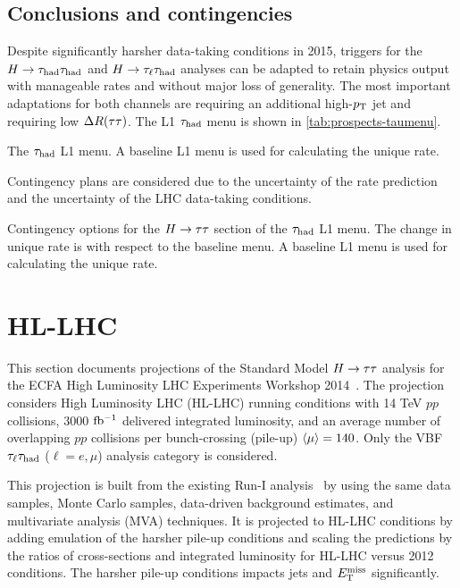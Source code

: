 \subsection{Conclusions and contingencies}

Despite significantly harsher data-taking conditions in 2015, triggers for the $H\rightarrow\tau_\text{had}\tau_\text{had}$ and $H\rightarrow\tau_\ell\tau_\text{had}$ analyses can be adapted to retain physics output with manageable rates and without major loss of generality. The most important adaptations for both channels are requiring an additional high-$p_{\mathrm{T}}$ jet and requiring low $\Delta R(\tau\tau)$. The L1 $\tau_\text{had}$ menu is shown in \cref{tab:prospects-taumenu}.

\begin{table}[bp]
  \centering
  \renewcommand{\arraystretch}{1.4}
  \caption{The $\tau_\text{had}$ L1 menu. A baseline L1 menu is used for calculating the unique rate.}
  
  \label{tab:prospects-taumenu}
\end{table}

Contingency plans are considered due to the uncertainty of the rate prediction and the uncertainty of the LHC data-taking conditions.

\begin{table}[bp]
  \centering
  \renewcommand{\arraystretch}{1.4}
  \caption{Contingency options for the $H\rightarrow\tau\tau$ section of the $\tau_\text{had}$ L1 menu. The change in unique rate is with respect to the baseline menu. A baseline L1 menu is used for calculating the unique rate.}
  
  \label{tab:prospects-contingencies}
\end{table}

\clearpage

\section{HL-LHC}
\label{sec:prospects-hllhc}

This section documents projections of the Standard Model $H\rightarrow\tau\tau$ analysis for the ECFA High Luminosity LHC Experiments Workshop 2014~\cite{ATL-PHYS-PUB-2014-018}. The projection considers High Luminosity LHC (HL-LHC) running conditions with 14 TeV $pp$ collisions, 3000 $\mbox{fb$^{-1}$}$ delivered integrated luminosity, and an average number of overlapping $pp$ collisions per bunch-crossing (pile-up) $\langle\mu\rangle = 140$. Only the VBF $\tau_\ell\tau_\text{had}$ ($\ell = e,\mu$) analysis category is considered.

This projection is built from the existing Run-I analysis~\cite{HIGG-2013-32} by using the same data samples, Monte Carlo samples, data-driven background estimates, and multivariate analysis (MVA) techniques. It is projected to HL-LHC conditions by adding emulation of the harsher pile-up conditions and scaling the predictions by the ratios of cross-sections and integrated luminosity for HL-LHC versus 2012 conditions. The harsher pile-up conditions impacts jets and $E_{\mathrm{T}}^{\mathrm{miss}}$ significantly.

